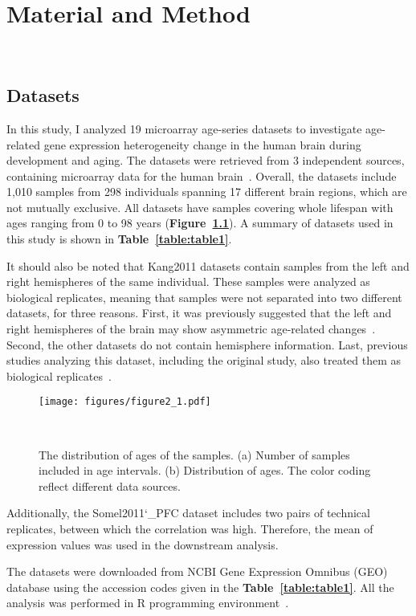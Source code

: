 \chapter{Material and Method}~\label{chp:b2}
\section{Datasets}
In this study, I analyzed 19 microarray age-series datasets to investigate age-related gene expression heterogeneity change in the human brain during development and aging.
The datasets were retrieved from 3 independent sources, containing microarray data for the human brain~\autocite{Colantuoni2011, Kang2011, Somel2011, Somel2010}.
Overall, the datasets include 1,010 samples from 298 individuals spanning 17 different brain regions, which are not mutually exclusive.
All datasets have samples covering whole lifespan with ages ranging from 0 to 98 years (\textbf{Figure~\ref{fig:fig2.1}}).
A summary of datasets used in this study is shown in \textbf{Table~\ref{table:table1}}.

It should also be noted that Kang2011 datasets contain samples from the left and right hemispheres of the same individual.
These samples were analyzed as biological replicates, meaning that samples were not separated into two different datasets, for three reasons.
First, it was previously suggested that the left and right hemispheres of the brain may show asymmetric age-related changes~\autocite{Sun2005, Dolcos2002}.
Second, the other datasets do not contain hemisphere information.
Last, previous studies analyzing this dataset, including the original study, also treated them as biological replicates~\autocite{Kang2011, Donertas2017}.

\begin{figure}[!ht]
\centering
\texttt{[image: figures/figure2\_1.pdf]}
\caption{The distribution of ages of the samples. 
(a) Number of samples included in age intervals. 
(b) Distribution of ages. The color coding reflect different data sources.}~\label{fig:fig2.1}
\end{figure}

Additionally, the Somel2011\char`_PFC dataset includes two pairs of technical replicates, between which the correlation was high. 
Therefore, the mean of expression values was used in the downstream analysis.

The datasets were downloaded from NCBI Gene Expression Omnibus (GEO) database using the accession codes given in the \textbf{Table~\ref{table:table1}}. 
All the analysis was performed in R programming environment~\autocite{R2020}.

